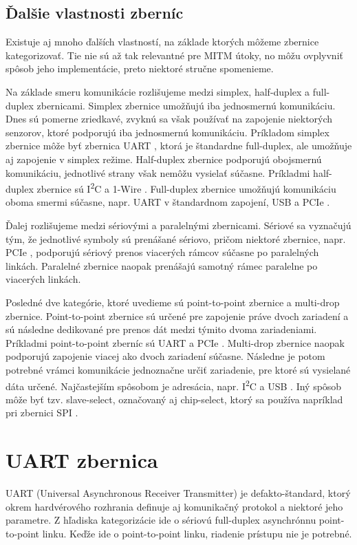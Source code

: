 \subsection{Ďalšie vlastnosti zberníc}
Existuje aj mnoho ďalších vlastností, na základe ktorých môžeme zbernice kategorizovať. Tie nie sú až tak relevantné pre MITM útoky, no môžu ovplyvniť spôsob jeho implementácie, preto niektoré stručne spomenieme.

Na základe smeru komunikácie rozlišujeme medzi simplex, half-duplex a full-duplex zbernicami. Simplex zbernice umožňujú iba jednosmernú komunikáciu. Dnes sú pomerne zriedkavé, zvyknú sa však používať na zapojenie niektorých senzorov, ktoré podporujú iba jednosmernú komunikáciu. Príkladom simplex zbernice môže byť zbernica UART \cite{uartBus}, ktorá je štandardne full-duplex, ale umožňuje aj zapojenie v simplex režime. Half-duplex zbernice podporujú obojsmernú komunikáciu, jednotlivé strany však nemôžu vysielať súčasne. Príkladmi half-duplex zbernice sú I\textsuperscript{2}C \cite{i2cSpec} a 1-Wire \cite{1wireBus}. Full-duplex zbernice umožňujú komunikáciu oboma smermi súčasne, napr. UART \cite{uartBus} v štandardnom zapojení, USB \cite{usbSpec} a PCIe \cite{pcieSpec}.

Ďalej rozlišujeme medzi sériovými a paralelnými zbernicami. Sériové sa vyznačujú tým, že jednotlivé symboly sú prenášané sériovo, pričom niektoré zbernice, napr. PCIe \cite{pcieSpec}, podporujú sériový prenos viacerých rámcov súčasne po paralelných linkách. Paralelné zbernice naopak prenášajú samotný rámec paralelne po viacerých linkách.

Posledné dve kategórie, ktoré uvedieme sú point-to-point zbernice a multi-drop zbernice. Point-to-point zbernice sú určené pre zapojenie práve dvoch zariadení a sú následne dedikované pre prenos dát medzi týmito dvoma zariadeniami. Príkladmi point-to-point zberníc sú UART \cite{uartBus} a PCIe \cite{pcieSpec}. Multi-drop zbernice naopak podporujú zapojenie viacej ako dvoch zariadení súčasne. Následne je potom potrebné vrámci komunikácie jednoznačne určiť zariadenie, pre ktoré sú vysielané dáta určené. Najčastejším spôsobom je adresácia, napr. I\textsuperscript{2}C \cite{i2cSpec} a USB \cite{usbSpec}. Iný spôsob môže byť tzv. slave-select, označovaný aj chip-select, ktorý sa používa napríklad pri zbernici SPI \cite{spiBus}.

\section{UART zbernica}
UART (Universal Asynchronous Receiver Transmitter) je defakto-štandard, ktorý okrem hardvérového rozhrania definuje aj komunikačný protokol a niektoré jeho parametre. Z hľadiska kategorizácie ide o sériovú full-duplex asynchrónnu point-to-point linku. Keďže ide o point-to-point linku, riadenie prístupu nie je potrebné.

